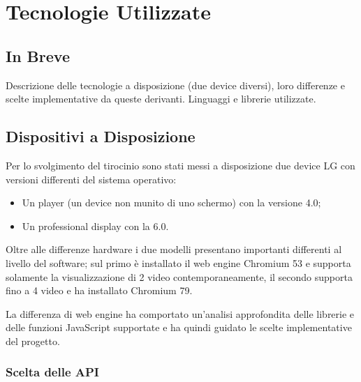 \chapter{Tecnologie Utilizzate}

\section{In Breve}
Descrizione delle tecnologie a disposizione (due device diversi), loro differenze e scelte implementative da queste derivanti. Linguaggi e librerie utilizzate. 

\section{Dispositivi a Disposizione}
Per lo svolgimento del tirocinio sono stati messi a disposizione due device LG con versioni differenti del sistema operativo:
\begin{itemize}
    \item Un player (un device non munito di uno schermo) con la versione 4.0;
    \item Un professional display con la 6.0.
\end{itemize}

Oltre alle differenze hardware i due modelli presentano importanti differenti al livello del software; sul primo è installato il web engine Chromium 53 e supporta solamente la visualizzazione di 2 video contemporaneamente, il secondo supporta fino a 4 video e ha installato Chromium 79.

La differenza di web engine ha comportato un'analisi approfondita delle librerie e delle funzioni JavaScript supportate e ha quindi guidato le scelte implementative del progetto.

\subsection{Scelta delle API}



